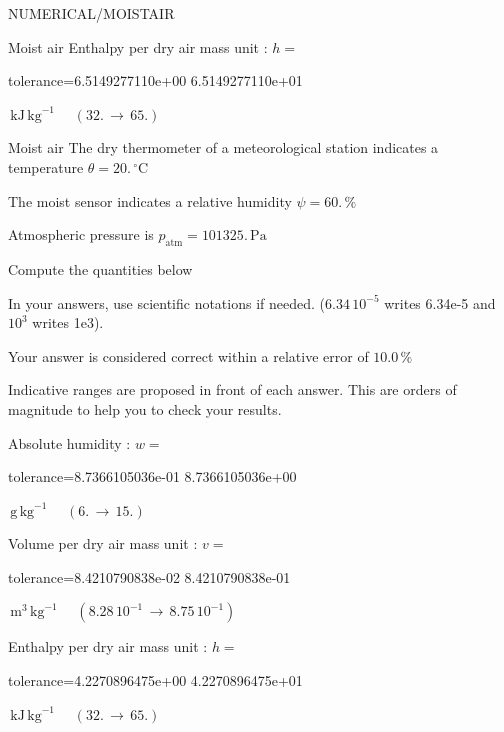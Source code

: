 \documentclass[12pt]{article}
\begin{document}
\begin{quiz}{NUMERICAL/MOISTAIR}
\begin{cloze}{Moist air}
Enthalpy per dry air mass unit : $h =  $
\begin{numerical}[points=2] 
\item[tolerance={6.5149277110e+00}] 6.5149277110e+01 
\end{numerical} 
 $\,  \mathrm{kJ}\,  \mathrm{kg}^{-1}$ 
 $ \quad (32. \, \rightarrow \, 65.) $ 

\end{cloze} 


 \begin{cloze}{Moist air} 
The dry thermometer of a meteorological station indicates a temperature $\theta = 20.\,  \mathrm{^\circ\mathrm{C}} $

The moist sensor indicates a relative humidity $\psi = 60.\, \% $

Atmospheric pressure is $p_{\text{atm}} = 101325.\,  \mathrm{Pa} $

 

Compute the quantities below

In your answers, use scientific notations if needed.  ($6.34\, 10^{-5}$ writes 6.34e-5 and $10^{3}$ writes 1e3).

Your answer is considered correct within a relative error of $10.0\, \% $

Indicative ranges are proposed in front of each answer. This are orders of magnitude to help you to check your results.

Absolute humidity : $w =  $
\begin{numerical}[points=1] 
\item[tolerance={8.7366105036e-01}] 8.7366105036e+00 
\end{numerical} 
 $\,  \mathrm{g}\,  \mathrm{kg}^{-1}$ 
 $ \quad (6. \, \rightarrow \, 15.) $ 

Volume per dry air mass unit : $v =  $
\begin{numerical}[points=1] 
\item[tolerance={8.4210790838e-02}] 8.4210790838e-01 
\end{numerical} 
 $\,  \mathrm{m}^{3}\,  \mathrm{kg}^{-1}$ 
 $ \quad ( 8.28 \, 10^{-1}  \, \rightarrow \,  8.75 \, 10^{-1} ) $ 

Enthalpy per dry air mass unit : $h =  $
\begin{numerical}[points=2] 
\item[tolerance={4.2270896475e+00}] 4.2270896475e+01 
\end{numerical} 
 $\,  \mathrm{kJ}\,  \mathrm{kg}^{-1}$ 
 $ \quad (32. \, \rightarrow \, 65.) $ 


\end{cloze}
\end{quiz}
\end{document}
